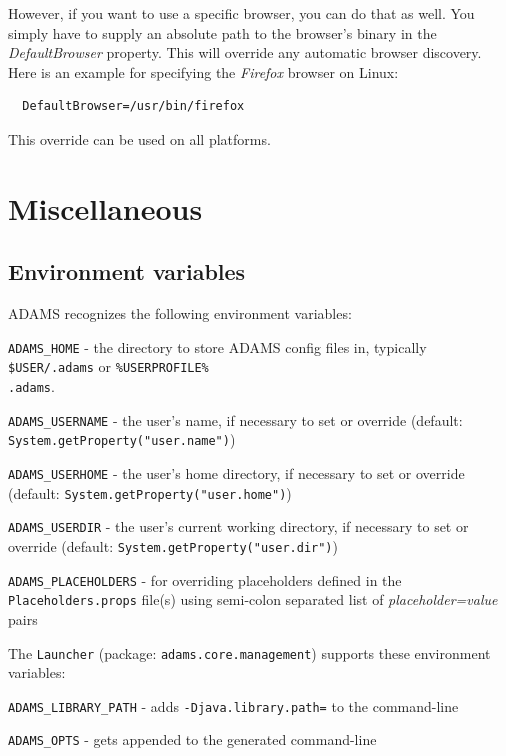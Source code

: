 However, if you want to use a specific browser, you can do that as well.
You simply have to supply an absolute path to the browser's binary in the
\textit{DefaultBrowser} property. This will override any automatic browser 
discovery. Here is an example for specifying the \textit{Firefox} browser on Linux:
\begin{verbatim}
  DefaultBrowser=/usr/bin/firefox
\end{verbatim}
This override can be used on all platforms.


\chapter{Miscellaneous}

\section{Environment variables}
ADAMS recognizes the following environment variables:
\begin{tight_itemize}
    \item \texttt{ADAMS\_HOME} - the directory to store ADAMS config files in, typically
    \texttt{\$USER/.adams} or \texttt{\%USERPROFILE\%\\.adams}.
    \item \texttt{ADAMS\_USERNAME} - the user's name, if necessary to set or override
    (default: \texttt{System.getProperty("user.name")})
    \item \texttt{ADAMS\_USERHOME} - the user's home directory, if necessary to set or override
    (default: \texttt{System.getProperty("user.home")})
    \item \texttt{ADAMS\_USERDIR} - the user's current working directory, if necessary to set or override
    (default: \texttt{System.getProperty("user.dir")})
    \item \texttt{ADAMS\_PLACEHOLDERS} - for overriding placeholders defined in the \texttt{Placeholders.props}
    file(s) using semi-colon separated list of \textit{placeholder=value} pairs
\end{tight_itemize}

\noindent The \texttt{Launcher} (package: \texttt{adams.core.management}) supports these
environment variables:
\begin{tight_itemize}
    \item \texttt{ADAMS\_LIBRARY\_PATH} - adds \texttt{-Djava.library.path=} to the command-line
    \item \texttt{ADAMS\_OPTS} - gets appended to the generated command-line
\end{tight_itemize}

